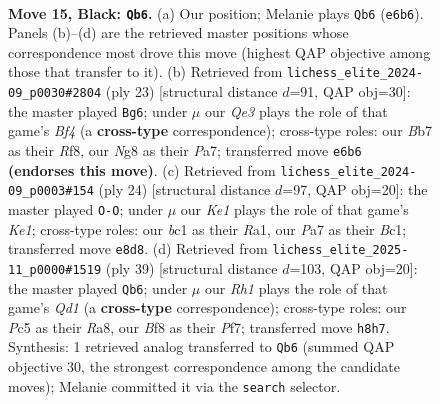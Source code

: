 \documentclass[11pt]{article}
\begin{document}
\clearpage

\begin{figure}[p]\centering
\begin{subfigure}{0.46\textwidth}\centering
\resizebox{\linewidth}{!}{%
\newchessgame
\chessboard[
  setfen={2r1kbnr/pb1p1pp1/4q3/2p1P1Pp/2p2P1P/2P4R/PP3QB1/RNB1K3 b Qk - 1 15},
  showmover=false,
  pgfstyle=straightmove, color=movearrow, markmove={e6-b6}
]}
\caption{}
\end{subfigure}\hfill
\begin{subfigure}{0.46\textwidth}\centering
\resizebox{\linewidth}{!}{%
\newchessgame
\chessboard[
  setfen={rn3rk1/ppp2pp1/4p2p/4Pbq1/4p1P1/1P2P2P/PBPN1P2/R2QK2R b KQ - 0 12},
  showmover=false,
  pgfstyle=straightmove, color=movearrow, markmove={f5-g6}
]}
\caption{}
\end{subfigure}
\\[4pt]
\begin{subfigure}{0.46\textwidth}\centering
\resizebox{\linewidth}{!}{%
\newchessgame
\chessboard[
  setfen={r1b2knr/pp2qp2/3Np1p1/2Ppb2p/3p4/Q5P1/PP2PPBP/R1B1K2R w KQ - 0 13},
  showmover=false,
  pgfstyle=straightmove, color=movearrow, markmove={e1-g1}
]}
\caption{}
\end{subfigure}\hfill
\begin{subfigure}{0.46\textwidth}\centering
\resizebox{\linewidth}{!}{%
\newchessgame
\chessboard[
  setfen={r2qr1k1/1p3ppp/2p5/p2p1b2/P1PPn3/1P2RN1P/5PP1/2RQ1BK1 b - - 2 20},
  showmover=false,
  pgfstyle=straightmove, color=movearrow, markmove={d8-b6}
]}
\caption{}
\end{subfigure}
\caption{\textbf{Move 15, Black: \texttt{Qb6}.} (a) Our position; Melanie plays \texttt{Qb6} (\texttt{e6b6}). Panels (b)--(d) are the retrieved master positions whose correspondence most drove this move (highest QAP objective among those that transfer to it). (b) Retrieved from \texttt{lichess\_elite\_2024-09\_p0030\#2804} (ply 23) [structural distance $d$=91, QAP obj=30]: the master played \texttt{Bg6}; under $\mu$ our \emph{Qe3} plays the role of that game's \emph{Bf4} (a \textbf{cross-type} correspondence); cross-type roles: our \emph{B}b7 as their \emph{R}f8, our \emph{N}g8 as their \emph{P}a7; transferred move \texttt{e6b6} \textbf{(endorses this move)}. (c) Retrieved from \texttt{lichess\_elite\_2024-09\_p0003\#154} (ply 24) [structural distance $d$=97, QAP obj=20]: the master played \texttt{O-O}; under $\mu$ our \emph{Ke1} plays the role of that game's \emph{Ke1}; cross-type roles: our \emph{b}c1 as their \emph{R}a1, our \emph{P}a7 as their \emph{B}c1; transferred move \texttt{e8d8}. (d) Retrieved from \texttt{lichess\_elite\_2025-11\_p0000\#1519} (ply 39) [structural distance $d$=103, QAP obj=20]: the master played \texttt{Qb6}; under $\mu$ our \emph{Rh1} plays the role of that game's \emph{Qd1} (a \textbf{cross-type} correspondence); cross-type roles: our \emph{P}c5 as their \emph{R}a8, our \emph{B}f8 as their \emph{P}f7; transferred move \texttt{h8h7}. Synthesis: 1 retrieved analog transferred to \texttt{Qb6} (summed QAP objective 30, the strongest correspondence among the candidate moves); Melanie committed it via the \texttt{search} selector.}
\label{fig:thought-m29}
\end{figure}
\end{document}
